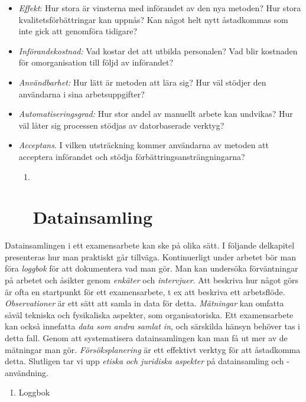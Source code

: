 \begin{itemize}
\item
  \emph{Effekt}: Hur stora är vinsterna med införandet av den nya
  metoden? Hur stora kvalitetsförbättringar kan uppnås? Kan något helt
  nytt åstadkommas som inte gick att genomföra tidigare?
\item
  \emph{Införandekostnad:} Vad kostar det att utbilda personalen? Vad
  blir kostnaden för omorganisation till följd av införandet?
\item
  \emph{Användbarhet:} Hur lätt är metoden att lära sig? Hur väl stödjer
  den användarna i sina arbetsuppgifter?
\item
  \emph{Automatiseringsgrad:} Hur stor andel av manuellt arbete kan
  undvikas? Hur väl låter sig processen stödjas av datorbaserade
  verktyg?
\item
  \emph{Acceptans}. I vilken utsträckning kommer användarna av metoden
  att acceptera införandet och stödja förbättringsansträngningarna?

  \begin{enumerate}
  \def\labelenumi{\arabic{enumi}.}
  \item ~
    \section{Datainsamling}\label{datainsamling}
  \end{enumerate}
\end{itemize}

Datainsamlingen i ett examensarbete kan ske på olika sätt. I följande
delkapitel presenteras hur man praktiskt går tillväga. Kontinuerligt
under arbetet bör man föra \emph{loggbok} för att dokumentera vad man
gör. Man kan undersöka förväntningar på arbetet och åsikter genom
\emph{enkäter} och \emph{intervjuer}. Att beskriva hur något görs är
ofta en startpunkt för ett examensarbete, t ex att beskriva ett
arbetsflöde. \emph{Observationer} är ett sätt att samla in data för
detta. \emph{Mätningar} kan omfatta såväl tekniska och fysikaliska
aspekter, som organisatoriska. Ett examensarbete kan också innefatta
\emph{data som andra samlat in}, och särskilda hänsyn behöver tas i
detta fall. Genom att systematisera datainsamlingen kan man få ut mer av
de mätningar man gör. \emph{Försöksplanering} är ett effektivt verktyg
för att åstadkomma detta. Slutligen tar vi upp \emph{etiska och
juridiska aspekter} på datainsamling och -användning.

\begin{enumerate}
\def\labelenumi{\arabic{enumi}.}
\item
  Loggbok
\end{enumerate}

